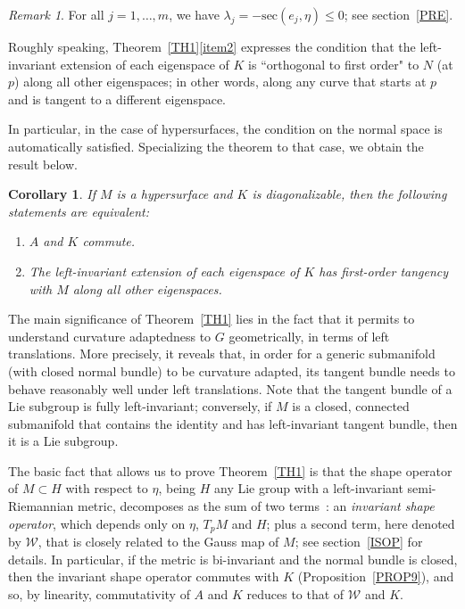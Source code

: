 \documentclass[a4paper,12pt,oneside]{amsart}
\theoremstyle{plain}
\newtheorem{corollary}[theorem]{Corollary}
\theoremstyle{remark}
\newtheorem{remark}[theorem]{Remark}
\theoremstyle{definition}
\begin{document}
\begin{remark}
For all $j =1,\dotsc,m$, we have $\lambda_{j} = -\mathrm{sec}(e_{j},\eta) \leq 0$; see section~\ref{PRE}.
\end{remark}

Roughly speaking, Theorem~\ref{TH1}\ref{item2} expresses the condition that the left-invariant extension of each eigenspace of $K$ is ``orthogonal to first order" to $N$ (at $p$) along all other eigenspaces; in other words, along any curve that starts at $p$ and is tangent to a different eigenspace. %

In particular, in the case of hypersurfaces, the condition on the normal space is automatically satisfied. Specializing the theorem to that case, we obtain the result below.
\begin{corollary}
If $M$ is a hypersurface and $K$ is diagonalizable, then the following statements are equivalent:
\begin{enumerate}[font=\upshape, label=(\roman*)]
\item $A$ and $K$ commute.
\item The left-invariant extension of each eigenspace of $K$ has first-order tangency with $M$ along all other eigenspaces.
\end{enumerate}
\end{corollary}

The main significance of Theorem~\ref{TH1} lies in the fact that it permits to understand curvature adaptedness to $G$ geometrically, in terms of left translations. More precisely, it reveals that, in order for a generic submanifold (with closed normal bundle) to be curvature adapted, its tangent bundle needs to behave reasonably well under left translations. Note that the tangent bundle of a Lie subgroup is fully left-invariant; conversely, if $M$ is a closed, connected submanifold that contains the identity and has left-invariant tangent bundle, then it is a Lie subgroup.

The basic fact that allows us to prove Theorem~\ref{TH1} is that the shape operator of $M\subset H$ with respect to $\eta$, being $H$ any Lie group with a left-invariant semi-Riemannian metric, decomposes as the sum of two terms~\cite{ripoll1991}: an \emph{invariant shape operator}, which depends only on $\eta$, $T_{p}M$ and $H$; plus a second term, here denoted by $\mathcal{W}$, that is closely related to the Gauss map of $M$; see section~\ref{ISOP} for details. In particular, if the metric is bi-invariant and the normal bundle is closed, then the invariant shape operator commutes with $K$ (Proposition~\ref{PROP9}), and so, by linearity, commutativity of $A$ and $K$ reduces to that of $\mathcal{W}$ and $K$.
\end{document}
